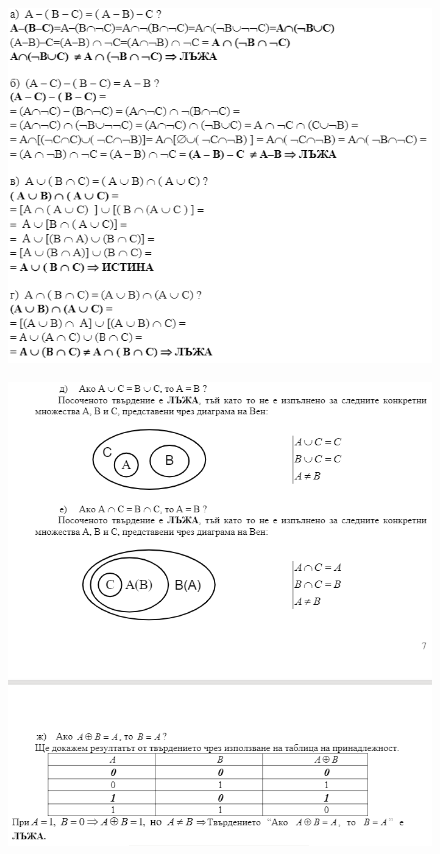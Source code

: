 \documentclass[fleqn, 12pt]{article}
\theoremstyle{definition}
\begin{document}
\begin{figure}[h!]
\includegraphics{Pics/ex3-task10-1.png}
\end{figure}

\begin{figure} 
\includegraphics{Pics/ex3-task10-2.png}
\end{figure}
\end{document}
